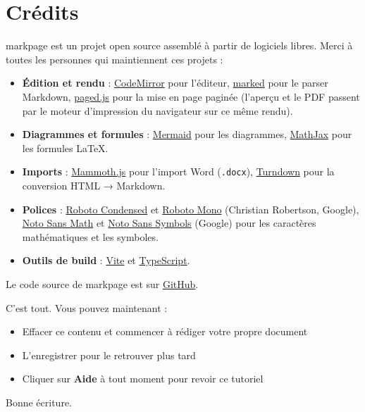 \documentclass[11pt,a4paper]{article}
\theoremstyle{definition}
\begin{document}
\section{Crédits}

markpage est un projet open source assemblé à partir de logiciels libres.
Merci à toutes les personnes qui maintiennent ces projets :


\begin{itemize}
  \item \textbf{Édition et rendu} :
\href{https://codemirror.net/}{CodeMirror} pour l'éditeur,
\href{https://marked.js.org/}{marked} pour le parser Markdown,
\href{https://pagedjs.org/}{paged.js} pour la mise en page paginée
(l'aperçu et le PDF passent par le moteur d'impression du
navigateur sur ce même rendu).
  \item \textbf{Diagrammes et formules} :
\href{https://mermaid.js.org/}{Mermaid} pour les diagrammes,
\href{https://www.mathjax.org/}{MathJax} pour les formules LaTeX.
  \item \textbf{Imports} :
\href{https://github.com/mwilliamson/mammoth.js}{Mammoth.js} pour
l'import Word (\texttt{.docx}),
\href{https://github.com/mixmark-io/turndown}{Turndown} pour la conversion
HTML → Markdown.
  \item \textbf{Polices} :
\href{https://fonts.google.com/specimen/Roboto+Condensed}{Roboto Condensed} et
\href{https://fonts.google.com/specimen/Roboto+Mono}{Roboto Mono}
(Christian Robertson, Google),
\href{https://fonts.google.com/noto/specimen/Noto+Sans+Math}{Noto Sans Math} et
\href{https://fonts.google.com/noto/specimen/Noto+Sans+Symbols}{Noto Sans Symbols}
(Google) pour les caractères mathématiques et les symboles.
  \item \textbf{Outils de build} :
\href{https://vitejs.dev/}{Vite} et \href{https://www.typescriptlang.org/}{TypeScript}.
\end{itemize}


Le code source de markpage est sur
\href{https://github.com/orlarey/markpage}{GitHub}.



\noindent\hrulefill\par


C'est tout. Vous pouvez maintenant :


\begin{itemize}
  \item Effacer ce contenu et commencer à rédiger votre propre document
  \item L'enregistrer pour le retrouver plus tard
  \item Cliquer sur \textbf{Aide} à tout moment pour revoir ce tutoriel
\end{itemize}


Bonne écriture.
\end{document}
